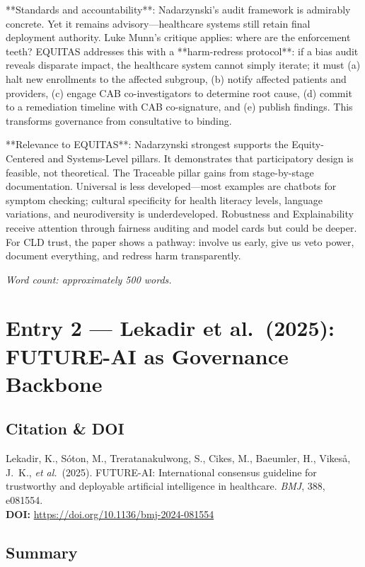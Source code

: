 \documentclass[12pt,twoside]{article}
\begin{document}
**Standards and accountability**: Nadarzynski's audit framework is admirably concrete. Yet it remains advisory—healthcare systems still retain final deployment authority. Luke Munn's critique applies: where are the enforcement teeth? EQUITAS addresses this with a **harm-redress protocol**: if a bias audit reveals disparate impact, the healthcare system cannot simply iterate; it must (a) halt new enrollments to the affected subgroup, (b) notify affected patients and providers, (c) engage CAB co-investigators to determine root cause, (d) commit to a remediation timeline with CAB co-signature, and (e) publish findings. This transforms governance from consultative to binding.

**Relevance to EQUITAS**: Nadarzynski strongest supports the Equity-Centered and Systems-Level pillars. It demonstrates that participatory design is feasible, not theoretical. The Traceable pillar gains from stage-by-stage documentation. Universal is less developed—most examples are chatbots for symptom checking; cultural specificity for health literacy levels, language variations, and neurodiversity is underdeveloped. Robustness and Explainability receive attention through fairness auditing and model cards but could be deeper. For CLD trust, the paper shows a pathway: involve us early, give us veto power, document everything, and redress harm transparently.

\emph{Word count: approximately 500 words.}

\newpage

\section*{Entry 2 --- Lekadir et al.\ (2025): FUTURE-AI as Governance Backbone}

\subsection*{Citation \& DOI}

Lekadir, K., Sóton, M., Treratanakulwong, S., Cikes, M., Baeumler, H., Vikeså, J.\ K., \textit{et al.}\ (2025). FUTURE-AI: International consensus guideline for trustworthy and deployable artificial intelligence in healthcare. \textit{BMJ}, 388, e081554. \\
\textbf{DOI:} \href{https://doi.org/10.1136/bmj-2024-081554}{https://doi.org/10.1136/bmj-2024-081554}

\subsection*{Summary}
\end{document}
